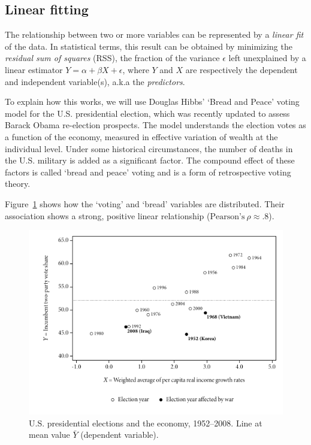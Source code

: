 	\subsection{Linear fitting}

  The relationship between two or more variables can be represented by a \emph{linear fit} of the data. In statistical terms, this result can be obtained by minimizing the \emph{residual sum of squares} (RSS), \ie the fraction of the variance $\epsilon$ left unexplained by a linear estimator $Y = \alpha + \beta X + \epsilon$, where $Y$ and $X$ are respectively the dependent and independent variable(s), a.k.a the \emph{predictors}.

  To explain how this works, we will use Douglas Hibbs' `Bread and Peace' voting model for the U.S. presidential election, which was recently updated to assess Barack Obama re-election prospects.\cite{Hibbs:2012a} The model understands the election votes as a function of the economy, measured in effective variation of wealth at the individual level. Under some historical circumstances, the number of deaths in the U.S. military is added as a significant factor. The compound effect of these factors is called `bread and peace' voting and is a form of retrospective voting theory.

  Figure~\ref{fig:hibbs_data} shows how the `voting' and `bread' variables are distributed. Their association shows a strong, positive linear relationship ($\text{Pearson's}~\rho \approx .8$).

  \begin{figure}[htp]
  	\includegraphics[width=.9\textwidth]{images/hibbs1.pdf}

  	\caption[U.S. presidential elections]{\label{fig:hibbs_data}
  	U.S. presidential elections and the economy, 1952--2008. %
  	Line at mean value $\bar Y$ (dependent variable). %
    \hibbs}
  \end{figure}%


